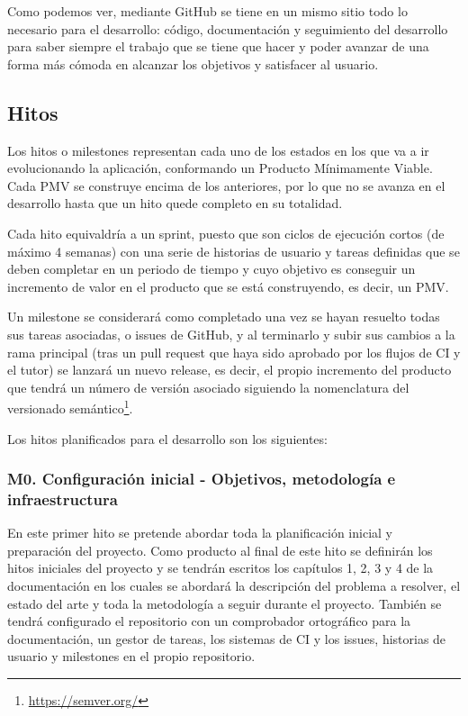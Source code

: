 Como podemos ver, mediante GitHub se tiene en un mismo sitio todo lo necesario
para el desarrollo: código, documentación y seguimiento del desarrollo para
saber siempre el trabajo que se tiene que hacer y poder avanzar de una forma más
cómoda en alcanzar los objetivos y satisfacer al usuario. 

\subsection{Hitos}
Los hitos o milestones representan cada uno de los estados en los que va a ir
evolucionando la aplicación, conformando un Producto Mínimamente Viable. Cada
PMV se construye encima de los anteriores, por lo que no se avanza en el
desarrollo hasta que un hito quede completo en su totalidad. 

Cada hito equivaldría a un sprint, puesto que son ciclos de ejecución cortos (de
máximo 4 semanas) con una serie de historias de usuario y tareas definidas que
se deben completar en un periodo de tiempo y cuyo objetivo es conseguir un
incremento de valor en el producto que se está construyendo, es decir, un PMV.

Un milestone se considerará como completado una vez se hayan resuelto todas sus
tareas asociadas, o issues de GitHub, y al terminarlo y subir sus cambios a la
rama principal (tras un pull request que haya sido aprobado por los flujos de CI
y el tutor) se lanzará un nuevo release, es decir, el propio incremento del
producto que tendrá un número de versión asociado siguiendo la nomenclatura del
versionado semántico\footnote{\url{https://semver.org/}}.

Los hitos planificados para el desarrollo son los siguientes:

\subsubsection{M0. Configuración inicial - Objetivos, metodología e infraestructura}
En este primer hito se pretende abordar toda la planificación inicial y
preparación del proyecto. Como producto al final de este hito se definirán los
hitos iniciales del proyecto y se tendrán escritos los capítulos 1, 2, 3 y 4 de
la documentación en los cuales se abordará la descripción del problema a
resolver, el estado del arte y toda la metodología a seguir durante el proyecto.
También se tendrá configurado el repositorio con un comprobador ortográfico para
la documentación, un gestor de tareas, los sistemas de CI y los issues,
historias de usuario y milestones en el propio repositorio.\\

